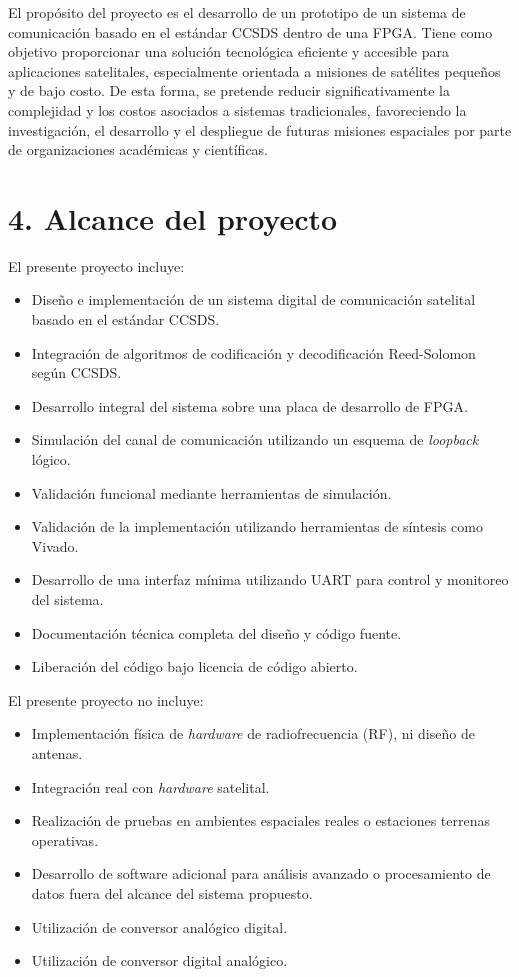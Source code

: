 \documentclass[
11pt, %
]{charter}
\begin{document}
El propósito del proyecto es el desarrollo de un prototipo de un sistema de comunicación basado en el estándar CCSDS dentro de una FPGA. Tiene como objetivo proporcionar una solución tecnológica eficiente y accesible para aplicaciones satelitales, especialmente orientada a misiones de satélites pequeños y de bajo costo. De esta forma, se pretende reducir significativamente la complejidad y los costos asociados a sistemas tradicionales, favoreciendo la investigación, el desarrollo y el despliegue de futuras misiones espaciales por parte de organizaciones académicas y científicas.

\section{4. Alcance del proyecto}
\label{sec:alcance}

El presente proyecto incluye:
\begin{itemize}
	\item Diseño e implementación de un sistema digital de comunicación satelital basado en el estándar CCSDS.
	\item Integración de algoritmos de codificación y decodificación Reed-Solomon según CCSDS.
	\item Desarrollo integral del sistema sobre una placa de desarrollo de FPGA.
	\item Simulación del canal de comunicación utilizando un esquema de \textit{loopback} lógico.
	\item Validación funcional mediante herramientas de simulación.
	\item Validación de la implementación utilizando herramientas de síntesis como Vivado.
	\item Desarrollo de una interfaz mínima utilizando UART para control y monitoreo del sistema.
	\item Documentación técnica completa del diseño y código fuente.
	\item Liberación del código bajo licencia de código abierto.
\end{itemize}

El presente proyecto no incluye:
\begin{itemize}
	\item Implementación física de \textit{hardware} de radiofrecuencia (RF), ni diseño de antenas.
	\item Integración real con \textit{hardware} satelital.
	\item Realización de pruebas en ambientes espaciales reales o estaciones terrenas operativas.
	\item Desarrollo de software adicional para análisis avanzado o procesamiento de datos fuera del alcance del sistema propuesto.
	\item Utilización de conversor analógico digital.
	\item Utilización de conversor digital analógico.
\end{itemize}
\end{document}
